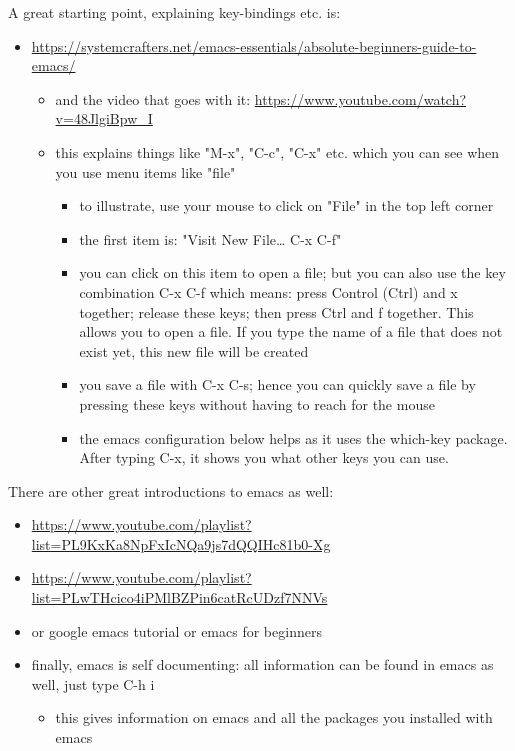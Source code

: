 \documentclass[11pt]{article}
\begin{document}
A great starting point, explaining key-bindings etc. is:
\begin{itemize}
\item \url{https://systemcrafters.net/emacs-essentials/absolute-beginners-guide-to-emacs/}
\begin{itemize}
\item and the video that goes with it: \url{https://www.youtube.com/watch?v=48JlgiBpw\_I}
\item this explains things like "M-x", "C-c", "C-x" etc. which you can see when you use menu items like "file"
\begin{itemize}
\item to illustrate, use your mouse to click on "File" in the top left corner
\item the first item is: "Visit New File\ldots{} C-x C-f"
\item you can click on this item to open a file; but you can also use the key combination C-x C-f which means: press Control (Ctrl) and x together; release these keys; then press Ctrl and f together. This allows you to open a file. If you type the name of a file that does not exist yet, this new file will be created
\item you save a file with C-x C-s; hence you can quickly save a file by pressing these keys without having to reach for the mouse
\item the emacs configuration below helps as it uses the which-key package. After typing C-x, it shows you what other keys you can use.
\end{itemize}
\end{itemize}
\end{itemize}

There are other great introductions to emacs as well:
\begin{itemize}
\item \url{https://www.youtube.com/playlist?list=PL9KxKa8NpFxIcNQa9js7dQQIHc81b0-Xg}
\item \url{https://www.youtube.com/playlist?list=PLwTHcico4iPMlBZPin6catRcUDzf7NNVs}
\item or google emacs tutorial or emacs for beginners
\item finally, emacs is self documenting: all information can be found in emacs as well, just type C-h i
\begin{itemize}
\item this gives information on emacs and all the packages you installed with emacs
\end{itemize}
\end{itemize}
\end{document}
